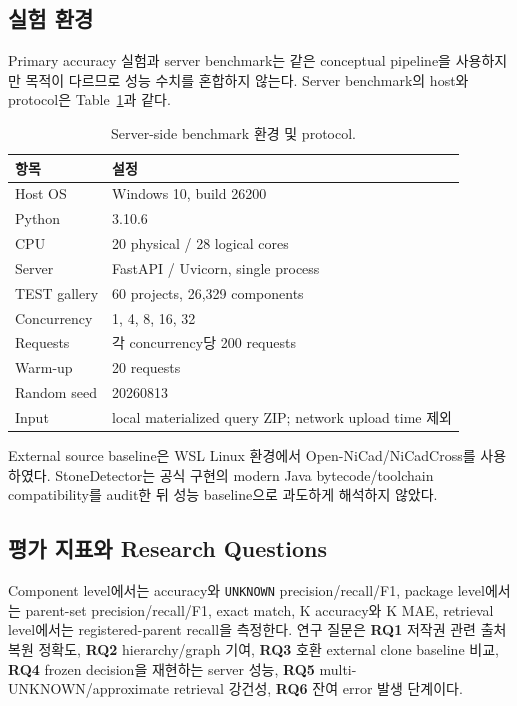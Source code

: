 \documentclass[runningheads]{llncs}
\begin{document}
\subsection{실험 환경}

Primary accuracy 실험과 server benchmark는 같은 conceptual pipeline을 사용하지만 목적이 다르므로 성능 수치를 혼합하지 않는다. Server benchmark의 host와 protocol은 Table~\ref{tab:environment}과 같다.

\begin{table}[!htbp]
\centering
\caption{Server-side benchmark 환경 및 protocol.}
\label{tab:environment}
\scriptsize
\begin{tabular}{p{4.1cm}p{7.1cm}}
\toprule
항목 & 설정\\
\midrule
Host OS & Windows 10, build 26200\\
Python & 3.10.6\\
CPU & 20 physical / 28 logical cores\\
Server & FastAPI / Uvicorn, single process\\
TEST gallery & 60 projects, 26,329 components\\
Concurrency & 1, 4, 8, 16, 32\\
Requests & 각 concurrency당 200 requests\\
Warm-up & 20 requests\\
Random seed & 20260813\\
Input & local materialized query ZIP; network upload time 제외\\
\bottomrule
\end{tabular}
\end{table}

External source baseline은 WSL Linux 환경에서 Open-NiCad/NiCadCross를 사용하였다. StoneDetector는 공식 구현의 modern Java bytecode/toolchain compatibility를 audit한 뒤 성능 baseline으로 과도하게 해석하지 않았다.

\subsection{평가 지표와 Research Questions}

Component level에서는 accuracy와 \texttt{UNKNOWN} precision/recall/F1, package level에서는 parent-set precision/recall/F1, exact match, K accuracy와 K MAE, retrieval level에서는 registered-parent recall을 측정한다. 연구 질문은 \textbf{RQ1} 저작권 관련 출처 복원 정확도, \textbf{RQ2} hierarchy/graph 기여, \textbf{RQ3} 호환 external clone baseline 비교, \textbf{RQ4} frozen decision을 재현하는 server 성능, \textbf{RQ5} multi-UNKNOWN/approximate retrieval 강건성, \textbf{RQ6} 잔여 error 발생 단계이다.
\end{document}
